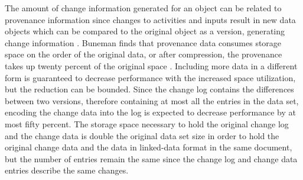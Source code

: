 The amount of change information generated for an object can be related to provenance information since changes to activities and inputs result in new data objects which can be compared to the original object as a version, generating change information \cite{Barkstrom2003}.
Buneman finds that provenance data consumes storage space on the order of the original data, or after compression, the provenance takes up twenty percent of the original space \cite{Buneman}.
Including more data in a different form is guaranteed to decrease performance with the increased space utilization, but the reduction can be bounded.
Since the change log contains the differences between two versions, therefore containing at most all the entries in the data set, encoding the change data into the log is expected to decrease performance by at most fifty percent.
The storage space necessary to hold the original change log and the change data is double the original data set size in order to hold the original change data and the data in linked-data format in the same document, but the number of entries remain the same since the change log and change data entries describe the same changes.
